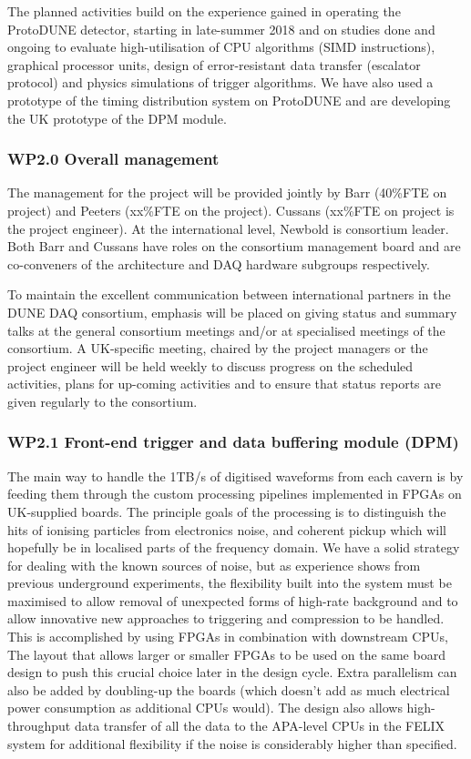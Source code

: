 The planned activities build on the experience gained in operating the 
ProtoDUNE detector, starting in late-summer 2018 and on studies done and ongoing
to evaluate high-utilisation of CPU algorithms (SIMD instructions),
graphical processor units, design of error-resistant data transfer
(escalator protocol) and physics simulations of trigger algorithms.
We have also used a prototype of the timing distribution system on ProtoDUNE
and are developing the UK prototype of the DPM module.

\subsubsection{WP2.0 Overall management}

The management for the project will be provided jointly by Barr (40\%FTE 
on project) and Peeters (xx\%FTE on the project).  Cussans (xx\%FTE on 
project is the project engineer).  At the international level, Newbold 
is consortium leader.  Both Barr and Cussans have roles on the consortium 
management board and are co-conveners of the architecture and DAQ 
hardware subgroups respectively.

To maintain the excellent communication between international partners in the 
DUNE DAQ consortium, emphasis will be placed on giving status and summary talks
at the general consortium meetings and/or at specialised meetings of the 
consortium.  A UK-specific meeting, chaired by the project managers or the 
project engineer will be held weekly to discuss progress on the scheduled 
activities, plans for up-coming activities and to ensure that status
reports are given regularly to the consortium.

\subsubsection{WP2.1 Front-end trigger and data buffering module (DPM)}

The main way to handle the 1TB/s of digitised waveforms from each cavern 
is by feeding them through the custom processing pipelines implemented 
in FPGAs on UK-supplied boards.  The principle goals of the processing is to
distinguish the hits of ionising particles from electronics noise, and
coherent pickup which will hopefully be in localised parts of the
frequency domain.  We have a solid strategy for dealing with the known
sources of noise, but as experience shows from previous underground
experiments, the flexibility built into the system must be maximised
to allow removal of unexpected forms of high-rate background and to
allow innovative new approaches to triggering and compression to be
handled.  This is accomplished by using FPGAs in combination with 
downstream CPUs,  The layout that allows larger or smaller FPGAs to 
be used on the same board design to push this crucial choice later 
in the design cycle.  Extra parallelism can also be added by doubling-up 
the boards (which doesn't add as much electrical power consumption 
as additional CPUs would).  The design also allows high-throughput 
data transfer of all the data to the APA-level CPUs in the FELIX 
system for additional flexibility if the noise is considerably higher 
than specified.

